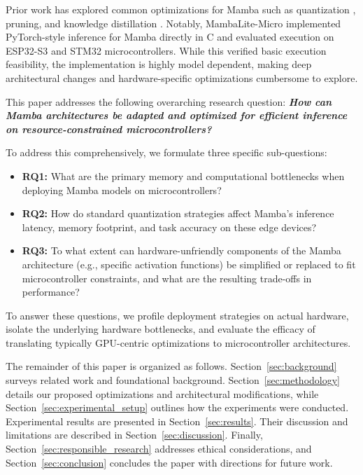 Prior work has explored common optimizations for Mamba such as quantization \cite{xuMambaQuantQuantizingMamba2025}, pruning, and knowledge distillation \cite{shihabEfficientUnstructuredPruning}. Notably, MambaLite-Micro \cite{xuMambaLiteMicroMemoryOptimizedMamba2025} implemented PyTorch-style inference for Mamba directly in C and evaluated execution on ESP32-S3 and STM32 microcontrollers. While this verified basic execution feasibility, the implementation is highly model dependent, making deep architectural changes and hardware-specific optimizations cumbersome to explore.

This paper addresses the following overarching research question:
\textit{\textbf{How can Mamba architectures be adapted and optimized for efficient inference on resource-constrained microcontrollers?}}

To address this comprehensively, we formulate three specific sub-questions:
\begin{itemize}
  \item \textbf{RQ1:} What are the primary memory and computational bottlenecks when deploying Mamba models on microcontrollers?
  \item \textbf{RQ2:} How do standard quantization strategies affect Mamba's inference latency, memory footprint, and task accuracy on these edge devices?
  \item \textbf{RQ3:} To what extent can hardware-unfriendly components of the Mamba architecture (e.g., specific activation functions) be simplified or replaced to fit microcontroller constraints, and what are the resulting trade-offs in performance?
\end{itemize}
To answer these questions, we profile deployment strategies on actual hardware, isolate the underlying hardware bottlenecks, and evaluate the efficacy of translating typically GPU-centric optimizations to microcontroller architectures.

The remainder of this paper is organized as follows. Section~\ref{sec:background} surveys related work and foundational background. Section~\ref{sec:methodology} details our proposed optimizations and architectural modifications, while Section~\ref{sec:experimental_setup} outlines how the experiments were conducted. Experimental results are presented in Section~\ref{sec:results}. Their discussion and limitations are described in Section~\ref{sec:discussion}. Finally, Section~\ref{sec:responsible_research} addresses ethical considerations, and Section~\ref{sec:conclusion} concludes the paper with directions for future work.